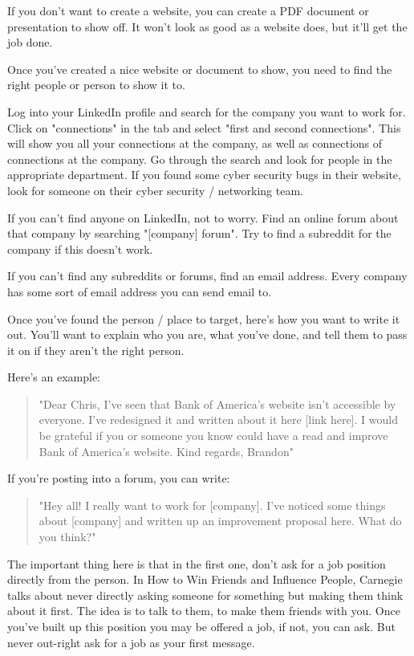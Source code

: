 \documentclass{article}
\begin{document}
If you don't want to create a website, you can create a PDF document or
presentation to show off. It won't look as good as a website does, but
it'll get the job done.

Once you've created a nice website or document to show, you need to find
the right people or person to show it to.

Log into your LinkedIn profile and search for the company you want to
work for. Click on "connections" in the tab and select "first and second
connections". This will show you all your connections at the company, as
well as connections of connections at the company. Go through the search
and look for people in the appropriate department. If you found some
cyber security bugs in their website, look for someone on their cyber
security / networking team.

If you can't find anyone on LinkedIn, not to worry. Find an online forum
about that company by searching "{[}company{]} forum". Try to find a
subreddit for the company if this doesn't work.

If you can't find any subreddits or forums, find an email address. Every
company has some sort of email address you can send email to.

Once you've found the person / place to target, here's how you want to
write it out. You'll want to explain who you are, what you've done, and
tell them to pass it on if they aren't the right person.

Here's an example:
\begin{quote}
    "Dear Chris, I've seen that Bank of America's website isn't accessible
by everyone. I've redesigned it and written about it here {[}link
here{]}. I would be grateful if you or someone you know could have a
read and improve Bank of America's website. Kind regards, Brandon"
\end{quote}
If you're posting into a forum, you can write:
\begin{quote}
    "Hey all! I really want to work for {[}company{]}. I've noticed some
things about {[}company{]} and written up an improvement proposal here.
What do you think?"
\end{quote}
The important thing here is that in the first one, don't ask for a job
position directly from the person. In How to Win Friends and Influence
People, Carnegie talks about never directly asking someone for something
but making them think about it first. The idea is to talk to them, to
make them friends with you. Once you've built up this position you may
be offered a job, if not, you can ask. But never out-right ask for a job
as your first message.
\end{document}
